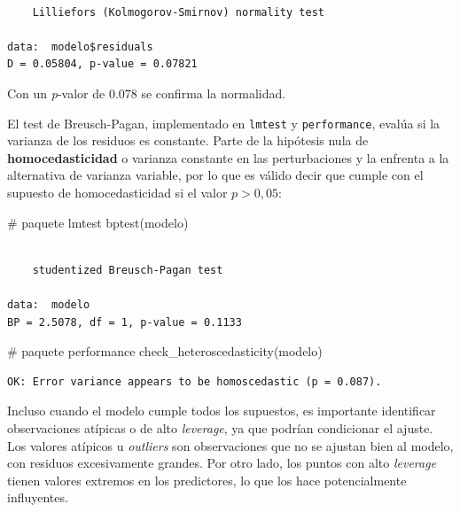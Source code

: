 \documentclass[
  spanish,
  a4paper,
]{scrbook}
\newenvironment{Shaded}{\begin{snugshade}}{\end{snugshade}}
\newcommand{\CommentTok}[1]{\textcolor[rgb]{0.37,0.37,0.37}{#1}}
\newcommand{\FunctionTok}[1]{\textcolor[rgb]{0.28,0.35,0.67}{#1}}
\newcommand{\NormalTok}[1]{\textcolor[rgb]{0.00,0.23,0.31}{#1}}
\begin{document}
\begin{verbatim}

    Lilliefors (Kolmogorov-Smirnov) normality test

data:  modelo$residuals
D = 0.05804, p-value = 0.07821
\end{verbatim}

Con un \emph{p}-valor de 0.078 se confirma la normalidad.

El test de Breusch-Pagan, implementado en \texttt{lmtest} y
\texttt{performance}, evalúa si la varianza de los residuos es
constante. Parte de la hipótesis nula de \textbf{homocedasticidad} o
varianza constante en las perturbaciones y la enfrenta a la alternativa
de varianza variable, por lo que es válido decir que cumple con el
supuesto de homocedasticidad si el valor \(p>0,05\):

\begin{Shaded}
\begin{Highlighting}[]
\CommentTok{\# paquete lmtest}
\FunctionTok{bptest}\NormalTok{(modelo)}
\end{Highlighting}
\end{Shaded}

\begin{verbatim}

    studentized Breusch-Pagan test

data:  modelo
BP = 2.5078, df = 1, p-value = 0.1133
\end{verbatim}

\begin{Shaded}
\begin{Highlighting}[]
\CommentTok{\# paquete performance}
\FunctionTok{check\_heteroscedasticity}\NormalTok{(modelo)}
\end{Highlighting}
\end{Shaded}

\begin{verbatim}
OK: Error variance appears to be homoscedastic (p = 0.087).
\end{verbatim}

Incluso cuando el modelo cumple todos los supuestos, es importante
identificar observaciones atípicas o de alto \emph{leverage}, ya que
podrían condicionar el ajuste. Los valores atípicos u \emph{outliers}
son observaciones que no se ajustan bien al modelo, con residuos
excesivamente grandes. Por otro lado, los puntos con alto
\emph{leverage} tienen valores extremos en los predictores, lo que los
hace potencialmente influyentes.
\end{document}
